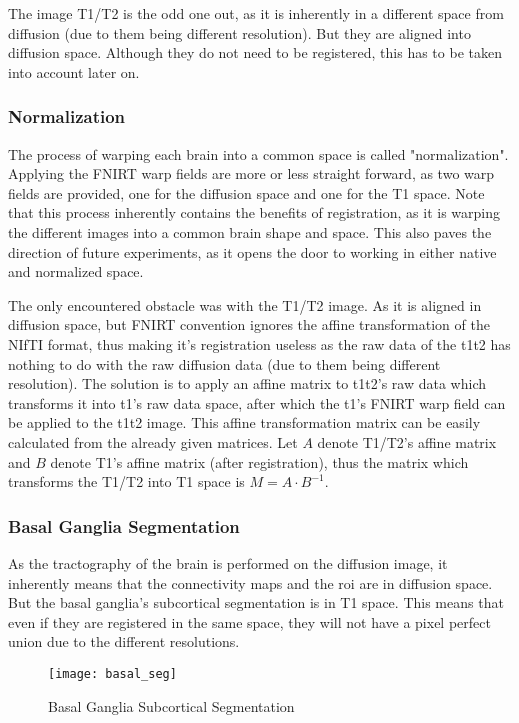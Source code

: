 The image T1/T2 is the odd one out, as it is inherently in a different space from diffusion (due to them being different resolution). But they are aligned into diffusion space. Although they do not need to be registered, this has to be taken into account later on.

\subsubsection{Normalization}
The process of warping each brain into a common space is called "normalization". Applying the \ac{FNIRT} warp fields are more or less straight forward, as two warp fields are provided, one for the diffusion space and one for the T1 space. Note that this process inherently contains the benefits of registration, as it is warping the different images into a common brain shape and space. This also paves the direction of future experiments, as it opens the door to working in either native and normalized space.\par

The only encountered obstacle was with the T1/T2 image. As it is aligned in diffusion space, but \ac{FNIRT} convention ignores the affine transformation of the \ac{NIfTI} format, thus making it's registration useless as the raw data of the t1t2 has nothing to do with the raw diffusion data (due to them being different resolution). The solution is to apply an affine matrix to t1t2's raw data which transforms it into t1's raw data space, after which the t1's \ac{FNIRT} warp field can be applied to the t1t2 image. This affine transformation matrix can be easily calculated from the already given matrices. Let $A$ denote T1/T2's affine matrix and $B$ denote T1's affine matrix (after registration), thus the matrix which transforms the T1/T2 into T1 space is $M = A \cdot B^{-1}$.

\subsubsection{Basal Ganglia Segmentation}

As the tractography of the brain is performed on the diffusion image, it inherently means that the connectivity maps and the roi are in diffusion space. But the basal ganglia's subcortical segmentation is in T1 space. This means that even if they are registered in the same space, they will not have a pixel perfect union due to the different resolutions.

\begin{figure}[H]
\centering
\texttt{[image: basal\_seg]}
\caption{Basal Ganglia Subcortical Segmentation}
\label{fig:basal_seg}
\end{figure}

